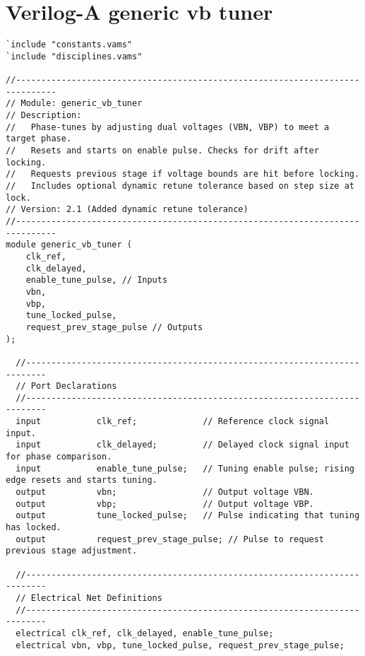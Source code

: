 \section{Verilog-A generic vb tuner}
\label{app:verilog-a-code-2}


\begin{lstlisting}[caption={Verilog-A Generic Vb Tuner Implementation}]
`include "constants.vams"
`include "disciplines.vams"

//------------------------------------------------------------------------------
// Module: generic_vb_tuner
// Description:
//   Phase-tunes by adjusting dual voltages (VBN, VBP) to meet a target phase.
//   Resets and starts on enable pulse. Checks for drift after locking.
//   Requests previous stage if voltage bounds are hit before locking.
//   Includes optional dynamic retune tolerance based on step size at lock.
// Version: 2.1 (Added dynamic retune tolerance)
//------------------------------------------------------------------------------
module generic_vb_tuner (
    clk_ref,
    clk_delayed,
    enable_tune_pulse, // Inputs
    vbn,
    vbp,
    tune_locked_pulse,
    request_prev_stage_pulse // Outputs
);

  //--------------------------------------------------------------------------
  // Port Declarations
  //--------------------------------------------------------------------------
  input           clk_ref;             // Reference clock signal input.
  input           clk_delayed;         // Delayed clock signal input for phase comparison.
  input           enable_tune_pulse;   // Tuning enable pulse; rising edge resets and starts tuning.
  output          vbn;                 // Output voltage VBN.
  output          vbp;                 // Output voltage VBP.
  output          tune_locked_pulse;   // Pulse indicating that tuning has locked.
  output          request_prev_stage_pulse; // Pulse to request previous stage adjustment.

  //--------------------------------------------------------------------------
  // Electrical Net Definitions
  //--------------------------------------------------------------------------
  electrical clk_ref, clk_delayed, enable_tune_pulse;
  electrical vbn, vbp, tune_locked_pulse, request_prev_stage_pulse;


\end{lstlisting}
